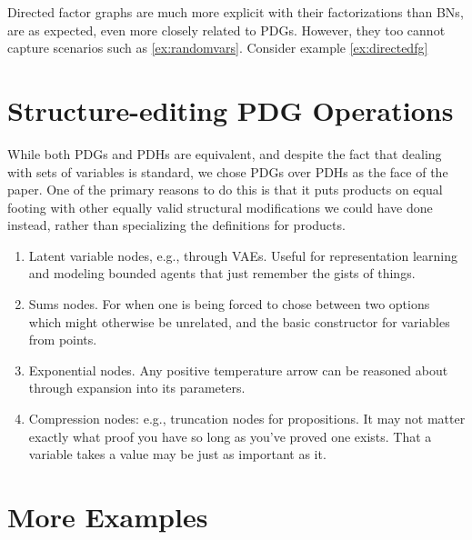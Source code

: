 \documentclass{article}
\newcommand{\MNH}{PDH}
\numberwithin{equation}{section}
\begin{document}
	Directed factor graphs are much more explicit with their factorizations than BNs, are as expected, even more closely related to PDGs. However, they too cannot capture scenarios such as \cref{ex:randomvars}. Consider example \ref{ex:directedfg}
	
	\begin{example}\label{ex:directedfg}
	\end{example}
	
	

	
	
	\section{Structure-editing PDG Operations}
	
	While both PDGs and \MNH s are equivalent, and despite the fact that dealing with sets of variables is standard, we chose PDGs over \MNH s as the face of the paper. One of the primary reasons to do this is that it puts products on equal footing with other equally valid structural modifications we could have done instead, rather than specializing the definitions for products.
	
	\begin{enumerate}
		\item Latent variable nodes, e.g., through VAEs. Useful for representation learning and modeling bounded agents that just remember the gists of things.
		
		\item Sums nodes. For when one is being forced to chose between two options which might otherwise be unrelated, and the basic constructor for variables from points.
		
		\item Exponential nodes. Any positive temperature arrow can be reasoned about through expansion into its parameters.
		
		\item Compression nodes: e.g., truncation nodes for propositions. It may not matter exactly what proof you have so long as you've proved one exists. That a variable takes a value may be just as important as it.
	\end{enumerate}
	
	
	\section{More Examples}\label{sec:more-examples}
	
\end{document}
